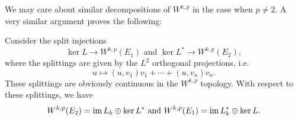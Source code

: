  We may care about similar decompositions of $W^{k,p}$ in the case
 when $p\ne 2$. A very similar argument proves the following:
 \begin{thm}
   Consider the split injections
   \begin{equation*}
     \ker L\to W^{k,p}(E_{1})\text{ and }\ker L^{*}\to W^{k,p}(E_{2}),
   \end{equation*}
   where the splittings are given by the $L^{2}$ orthogonal
   projections, i.e.
   \begin{equation*}
     u\mapsto (u,v_{1})v_{1}+\cdots+(u,v_{n})v_{n}.
   \end{equation*}
   These splittings are obviously continuous in the $W^{k,p}$
   topology. With respect to these splittings, we have
   \begin{equation*}
     W^{k,p}(E_{2})=\operatorname{\mathrm{im}} L_{k}\oplus \ker L^{*}\text{ and }W^{k,p}(E_{1})=\operatorname{\mathrm{im}} L_{k}^{*}\oplus \ker L.
   \end{equation*}
 \end{thm}


